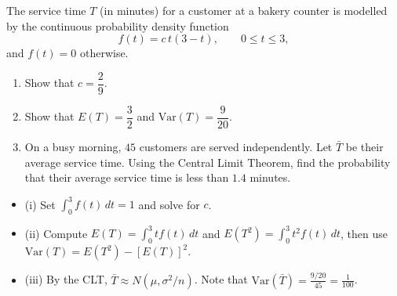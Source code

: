 \begin{problem}
The service time $T$ (in minutes) for a customer at a bakery counter is modelled by the continuous probability density function
\[
f(t) = c\,t(3-t), \qquad 0 \leq t \leq 3,
\]
and $f(t) = 0$ otherwise.
\begin{enumerate}[label=\textbf{(\roman*)}]
  \item Show that $c = \dfrac{2}{9}$.
  \item Show that $E(T) = \dfrac{3}{2}$ and $\mathrm{Var}(T) = \dfrac{9}{20}$.
  \item On a busy morning, $45$ customers are served independently. Let $\bar{T}$ be their average service time. Using the Central Limit Theorem, find the probability that their average service time is less than $1.4$ minutes.
\end{enumerate}
\end{problem}

\begin{hint}
\begin{itemize}[leftmargin=*]
  \item (i) Set $\int_0^3 f(t)\,dt = 1$ and solve for $c$.
  \item (ii) Compute $E(T) = \int_0^3 t f(t)\,dt$ and $E(T^2) = \int_0^3 t^2 f(t)\,dt$, then use $\mathrm{Var}(T) = E(T^2) - [E(T)]^2$.
  \item (iii) By the CLT, $\bar{T} \approx N(\mu, \sigma^2/n)$. Note that $\mathrm{Var}(\bar{T}) = \frac{9/20}{45} = \frac{1}{100}$.
\end{itemize}
\end{hint}

